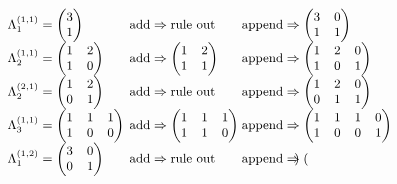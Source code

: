 \[{\small \begin{array}{lll}
\Lambda^{(1,1)}_1 = \begin{pmatrix}
3 \\
1
\end{pmatrix} & \!\!\!\!\hbox{add} \Rightarrow \hbox{rule out} & \!\!\!\!\!\hbox{append} \Rightarrow \begin{pmatrix}
3 & 0 \\
1 & 1
\end{pmatrix} \\
\Lambda^{(1,1)}_2 = \begin{pmatrix}
1 & 2 \\
1 & 0
\end{pmatrix} &\!\!\!\!\hbox{add} \Rightarrow \begin{pmatrix}
1 & 2 \\
1 & 1
\end{pmatrix} & \!\!\!\!\!\hbox{append} \Rightarrow \begin{pmatrix}
1 & 2 & 0\\
1 & 0 & 1
\end{pmatrix}\\
\Lambda^{(2,1)}_2=\begin{pmatrix}
1 & 2 \\
0 & 1
\end{pmatrix} & \!\!\!\!\hbox{add} \Rightarrow \hbox{rule out} &  \!\!\!\!\!\hbox{append} \Rightarrow \begin{pmatrix}
1 & 2 & 0\\
0 & 1 & 1
\end{pmatrix} \\
\Lambda^{(1,1)}_3 = \begin{pmatrix}
1 & 1 & 1 \\
1 & 0 & 0
\end{pmatrix} &  \!\!\!\!\hbox{add} \Rightarrow \begin{pmatrix}
1 & 1 & 1 \\
1 & 1 & 0
\end{pmatrix} &  \!\!\!\!\!\hbox{append} \Rightarrow \begin{pmatrix}
1 & 1 & 1 & 0 \\
1 & 0 & 0 & 1
\end{pmatrix} \\
\Lambda^{(1,2)}_1 = \begin{pmatrix}
3 & 0 \\
0 & 1
\end{pmatrix} & \!\!\!\!\hbox{add} \Rightarrow \hbox{rule out} &  \!\!\!\!\!\hbox{append} \Rightarrow \begin{pmatrix}

\end{pmatrix}
\end{array}}\]
